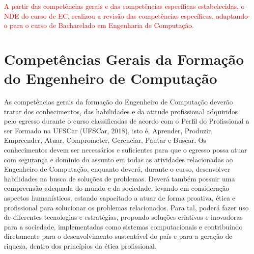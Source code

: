\textcolor{red}{A partir das competências gerais e das competências específicas estabelecidas, o NDE do curso de EC, realizou a revisão das competências específicas, adaptando-o para o curso de Bacharelado em Engenharia de Computação.}




\section{Competências Gerais da Formação do Engenheiro de Computação}\label{sec:competencias-gerais-da-formacao-do-engenheiro-de-computacao}

As competências gerais da formação do Engenheiro de Computação deverão tratar dos conhecimentos, das habilidades e da atitude profissional adquiridos pelo egresso durante o curso classificadas de acordo com o Perfil do Profissional a ser Formado na UFSCar (UFSCar, 2018), isto é, Aprender, Produzir, Empreender, Atuar, Comprometer, Gerenciar, Pautar e Buscar. Os conhecimentos devem ser necessários e suficientes para que o egresso possa atuar com segurança e domínio do assunto em todas as atividades relacionadas ao Engenheiro de Computação, enquanto deverá, durante o curso, desenvolver habilidades na busca de soluções de problemas. Deverá também possuir uma compreensão adequada do mundo e da sociedade, levando em consideração aspectos humanísticos, estando capacitado a atuar de forma proativa, ética e profissional para solucionar os problemas relacionados.
Para tal, poderá fazer uso de diferentes tecnologias e estratégias, propondo soluções criativas e inovadoras para a sociedade, implementadas como sistemas computacionais e contribuindo diretamente para o desenvolvimento sustentável do país e para a geração de riqueza, dentro dos princípios da ética profissional.

